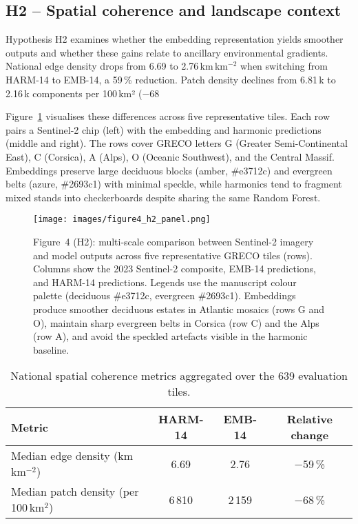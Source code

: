 \documentclass[utf8]{FrontiersinHarvard}
\begin{document}
\subsection{H2 -- Spatial coherence and landscape context}
Hypothesis H2 examines whether the embedding representation yields smoother outputs and whether these gains relate to ancillary environmental gradients. National edge density drops from 6.69 to 2.76\,km\,km\(^{-2}\) when switching from HARM-14 to EMB-14, a 59\,\% reduction. Patch density declines from 6.81\,k to 2.16\,k components per 100\,km² (−68\,%

Figure~\ref{fig:h2_multiscale} visualises these differences across five representative tiles. Each row pairs a Sentinel-2 chip (left) with the embedding and harmonic predictions (middle and right). The rows cover GRECO letters G (Greater Semi-Continental East), C (Corsica), A (Alps), O (Oceanic Southwest), and the Central Massif. Embeddings preserve large deciduous blocks (amber, \#e3712c) and evergreen belts (azure, \#2693c1) with minimal speckle, while harmonics tend to fragment mixed stands into checkerboards despite sharing the same Random Forest.

\begin{figure}[H]
    \centering
    \texttt{[image: images/figure4\_h2\_panel.png]}
    \caption{Figure~4 (H2): multi-scale comparison between Sentinel-2 imagery and model outputs across five representative GRECO tiles (rows). Columns show the 2023 Sentinel-2 composite, EMB-14 predictions, and HARM-14 predictions. Legends use the manuscript colour palette (deciduous \#e3712c, evergreen \#2693c1). Embeddings produce smoother deciduous estates in Atlantic mosaics (rows G and O), maintain sharp evergreen belts in Corsica (row C) and the Alps (row A), and avoid the speckled artefacts visible in the harmonic baseline.}
    \label{fig:h2_multiscale}
\end{figure}

\begin{table}[H]
    \centering
    \small
    \begin{tabular}{lccc}
        \toprule
        \textbf{Metric} & \textbf{HARM-14} & \textbf{EMB-14} & \textbf{Relative change} \\
        \midrule
        Median edge density (km\,km\(^{-2}\)) & 6.69 & 2.76 & −59\,\% \\
        Median patch density (per 100\,km\(^2\)) & 6\,810 & 2\,159 & −68\,\% \\
        \bottomrule
    \end{tabular}
    \caption{National spatial coherence metrics aggregated over the 639 evaluation tiles.}
    \label{tab:coherence_summary}
\end{table}
\end{document}
